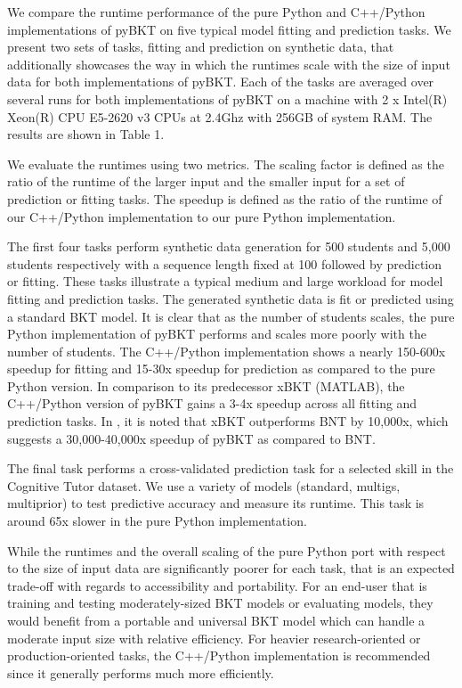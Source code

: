 \documentclass{edm_article}
\begin{document}

We compare the runtime performance of the pure Python and C++/Python implementations of pyBKT on five typical model fitting and prediction tasks. We present two sets of tasks, fitting and prediction on synthetic data, that additionally showcases the way in which the runtimes scale with the size of input data for both implementations of pyBKT. Each of the tasks are averaged over several runs for both implementations of pyBKT on a machine with 2 x Intel(R) Xeon(R) CPU E5-2620 v3 CPUs at 2.4Ghz with 256GB of system RAM. The results are shown in Table 1.

We evaluate the runtimes using two metrics. The scaling factor is defined as the ratio of the runtime of the larger input and the smaller input for a set of prediction or fitting tasks. The speedup is defined as the ratio of the runtime of our C++/Python implementation to our pure Python implementation.

The first four tasks perform synthetic data generation for 500 students and 5,000 students respectively with a sequence length fixed at 100 followed by prediction or fitting. These tasks illustrate a typical medium and large workload for model fitting and prediction tasks. The generated synthetic data is fit or predicted using a standard BKT model. It is clear that as the number of students scales, the pure Python implementation of pyBKT performs and scales more poorly with the number of students. The C++/Python implementation shows a nearly 150-600x speedup for fitting and 15-30x speedup for prediction as compared to the pure Python version. In comparison to its predecessor xBKT (MATLAB), the C++/Python version of pyBKT gains a 3-4x speedup across all fitting and prediction tasks. In \citet{xu2015xbkt}, it is noted that xBKT outperforms BNT by 10,000x, which suggests a 30,000-40,000x speedup of pyBKT as compared to BNT.

The final task performs a cross-validated prediction task for a selected skill in the Cognitive Tutor dataset. We use a variety of models (standard, multigs, multiprior) to test predictive accuracy and measure its runtime. This task is around 65x slower in the pure Python implementation.

While the runtimes and the overall scaling of the pure Python port with respect to the size of input data are significantly poorer for each task, that is an expected trade-off with regards to accessibility and portability. For an end-user that is training and testing moderately-sized BKT models or evaluating models, they would benefit from a portable and universal BKT model which can handle a moderate input size with relative efficiency. For heavier research-oriented or production-oriented tasks, the C++/Python implementation is recommended since it generally performs much more efficiently.
\end{document}
